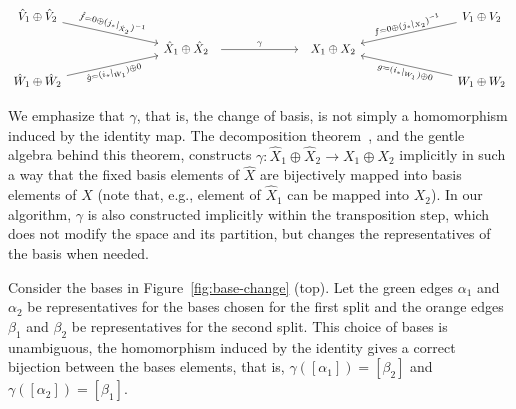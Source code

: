 \documentclass[letterpaper,11pt]{article}
\theoremstyle{plain}
\theoremstyle{definition}
\newcounter{li}
\begin{document}
\begin{equation}\label{eq:lefschetz_ar_split_regular_mirrored}
\begin{tikzcd}[row sep=small, column sep=2.7cm]
    \hat{V}_1\oplus \hat{V}_2 
        \arrow[rd, "\hat{f}=0\oplus (j_\ast|_{\hat{X}_2})^{-1}", sloped]
        & & &
        V_1\oplus V_2
            \arrow[ld, "f=0\oplus (j_\ast|_{X_2})^{-1}", sloped] \\
    &
    \hat{X}_1\oplus \hat{X}_2 \arrow[r, "\gamma", shorten >=6pt, shorten <=6pt]
    &
    X_1\oplus X_2
    \\
    \hat{W}_1\oplus \hat{W}_2
        \arrow[ru, "\hat{g}=(i_\ast|_{\hat{W}_1})\oplus 0", swap, sloped]
        & & &
        W_1\oplus W_2
            \arrow[lu, "g=(i_\ast|_{W_1})\oplus 0", swap, sloped]
\end{tikzcd}
\end{equation}

We emphasize that $\gamma$, that is, the change of basis, is not simply a homomorphism induced by the identity map.
The decomposition theorem~\cite[Theorem~7.6]{CMbarcodes2025}, and the gentle algebra behind this theorem,
    constructs $\gamma:\hat{X}_1\oplus \hat{X}_2\rightarrow X_1\oplus X_2$ implicitly in such a way that the fixed basis elements of $\hat{X}$ are bijectively mapped into basis elements of $X$ (note that, e.g., element of $\hat{X}_1$ can be mapped into $X_2$).
In our algorithm, $\gamma$ is also constructed implicitly within the transposition step, which does not modify the space and its partition, but changes the representatives of the basis when needed.

Consider the bases in Figure~\ref{fig:base-change} (top).
Let the green edges $\alpha_1$ and $\alpha_2$ be representatives for the bases chosen for the first split and the orange edges $\beta_1$ and $\beta_2$ be representatives for the second split. 
This choice of bases is unambiguous, 
    the homomorphism induced by the identity gives a correct bijection between the bases elements,
    that is,
    $\gamma([\alpha_1])=[\beta_2]$ and $\gamma([\alpha_2])=[\beta_1]$.
    
\end{document}
